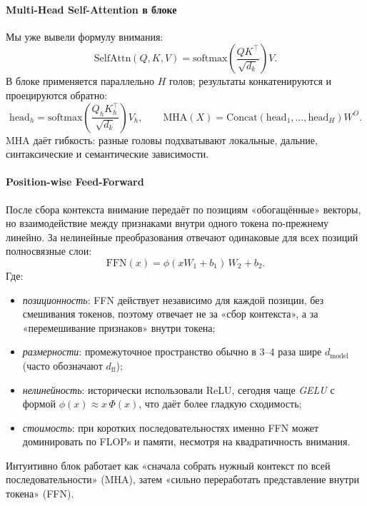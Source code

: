 \documentclass[12pt,a4paper]{article}
\begin{document}
\paragraph{Multi-Head Self-Attention в блоке}
Мы уже вывели формулу внимания:
\[
\mathrm{SelfAttn}(Q,K,V)=\mathrm{softmax}\!\left(\frac{QK^\top}{\sqrt{d_k}}\right)V.
\]
В блоке применяется параллельно $H$ голов; результаты конкатенируются и проецируются обратно:
\[
\mathrm{head}_h=
\mathrm{softmax}\!\left(\frac{Q_hK_h^\top}{\sqrt{d_k}}\right)V_h,
\qquad
\mathrm{MHA}(X)=\mathrm{Concat}(\mathrm{head}_1,\ldots,\mathrm{head}_H)W^O.
\]
MHA даёт гибкость: разные головы подхватывают локальные, дальние, синтаксические и семантические зависимости.

\paragraph{Position-wise Feed-Forward}
После сбора контекста внимание передаёт по позициям «обогащённые» векторы, но взаимодействие между признаками внутри одного токена по-прежнему линейно. За нелинейные преобразования отвечают одинаковые для всех позиций полносвязные слои:
\[
\mathrm{FFN}(x)=\phi(xW_1+b_1)\,W_2+b_2.
\]
Где:
\begin{itemize}
  \item \textit{позиционность}: FFN действует независимо для каждой позиции, без смешивания токенов, поэтому отвечает не за «сбор контекста», а за «перемешивание признаков» внутри токена;
  \item \textit{размерности}: промежуточное пространство обычно в $3$–$4$ раза шире $d_{\text{model}}$ (часто обозначают $d_{\text{ff}}$);
  \item \textit{нелинейность}: исторически использовали ReLU, сегодня чаще \textit{GELU} с формой $\phi(x)\approx x\,\Phi(x)$, что даёт более гладкую сходимость;
  \item \textit{стоимость}: при коротких последовательностях именно FFN может доминировать по FLOPs и памяти, несмотря на квадратичность внимания.
\end{itemize}
Интуитивно блок работает как «сначала собрать нужный контекст по всей последовательности» (MHA), затем «сильно переработать представление внутри токена» (FFN).
\end{document}
